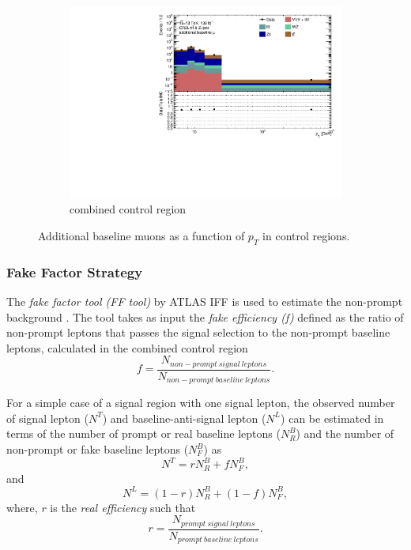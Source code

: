 \begin{figure}[!htb]
\begin{subfigure}{.48\textwidth}
    \end{subfigure} \\
    \begin{subfigure}{.48\textwidth}
        \centering
        \includegraphics[width=.9\linewidth]{figures/Analysis/Background/Overlay_pt_Baseline_muons_Combined.pdf}
        \caption{combined control region \label{fig:Add_mu_combined}}
    \end{subfigure}
        \caption{ Additional baseline muons as a function of $p_{T}$ in control regions. \label{fig:ControlRegionsAdditionalBaselineMuonpT}}
\end{figure}

\subsubsection{ Fake Factor Strategy }
\label{subsubsec:EstimationStrategy}

The \textit{fake factor tool (FF tool)} by ATLAS IFF is used to estimate the non-prompt background \cite{FakeBkgTool}. The tool takes as input the \textit{fake efficiency (f)} defined as the ratio of non-prompt leptons that passes the signal selection to the non-prompt baseline leptons, calculated in the combined control region
\begin{equation}
f = \frac{N_{non-prompt~signal~leptons}}{N_{non-prompt~baseline~leptons}}.
\end{equation}

For a simple case of a signal region with one signal lepton, the observed number of signal lepton ($N^{T}$) and baseline-anti-signal lepton ($N^{L}$) can be estimated in terms of the number of prompt or real baseline leptons ($N^{B}_{R}$) and the number of non-prompt or fake baseline leptons ($N^{B}_{F}$) as
\begin{equation}
N^{T} = rN^{B}_{R}+fN^{B}_{F},
\label{eqn:NoOfTight}
\end{equation}
and 
\begin{equation}
N^{L} = (1-r)N^{B}_{R} + (1-f)N^{B}_{F},
\label{eqn:NoOfLoose}
\end{equation}
where, $r$ is the \textit{real efficiency} such that 
\begin{equation} 
    r=\frac{N_{prompt~signal~leptons}}{N_{prompt~baseline~leptons}}.
\end{equation}

